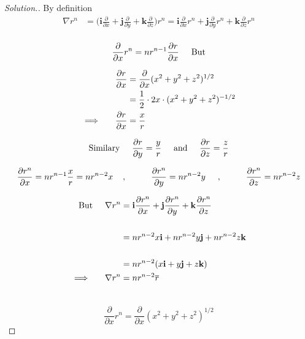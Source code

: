 \documentclass[11pt,a4paper]{article}
\theoremstyle{definition}
\newenvironment{solution}
  {\renewcommand{\qedsymbol}{}\begin{proof}[\textit{Solution}.]}
  {\end{proof}}
\begin{document}
\begin{solution}
By definition
\begin{align*}
\nabla r^n  & = \Bigg( \textbf{i} \frac{\partial}{\partial x} + \textbf{j} \frac{\partial}{\partial y} + \textbf{k}\frac{\partial}{\partial z}\Bigg) r^n
  = \textbf{i} \frac{\partial}{\partial x}r^n + \textbf{j} \frac{\partial}{\partial y}r^n + \textbf{k}\frac{\partial}{\partial z}r^n\\
\end{align*}

$$ \frac{\partial}{\partial x}r^n = n r^{n-1} \frac{\partial r}{\partial x}\hspace{0.5cm}\text{But}$$

\begin{align*}
\frac{\partial r}{\partial x} & = \frac{\partial}{\partial x} (x^2 + y^2 + z^2)^{1/2}\\
& = \frac{1}{2}\cdot 2x\cdot (x^2 + y^2 + z^2)^{-1/2}\\
\implies \hspace{0.5cm}\frac{\partial r}{\partial x} & = \frac{x}{r}\\
\end{align*}

$$\text{Similary}\hspace{0.5cm} \frac{\partial r}{\partial y} = \frac{y}{r}\hspace{0.5cm} \text{and} \hspace{0.5cm} \frac{\partial r}{\partial z} = \frac{z}{r}$$


$$\frac{\partial r^n}{\partial x} = nr^{n-1} \frac{x}{r} = nr^{n-2}x\hspace{0.4cm},\hspace{1cm} \frac{\partial r^n}{\partial y} = nr^{n-2}y\hspace{0.5cm},\hspace{1cm} \frac{\partial r^n}{\partial z}= nr^{n-2}z$$

\begin{align*}
\text{But} \hspace{0.5cm} \nabla r^n & = \textbf{i}\frac{\partial r^n}{\partial x} + \textbf{j} \frac{\partial r^n}{\partial y} + \textbf{k} \frac{\partial r^n}{\partial z}\\\\
& = nr^{n-2}x \textbf{i} + nr^{n-2} y \textbf{j} + nr^{n-2} z\textbf{k}\\\\
& = nr^{n-2} (x\textbf{i} + y \textbf{j} + z\textbf{k})\\
\implies \hspace{0.5cm} \nabla r^n & = nr^{n-2}\overline{r}\\\\
\end{align*}

$$\frac{\partial}{\partial x} r^n = \frac{\partial}{\partial x} (x^2 + y^2 + z^2 )^{1/2}$$
\end{solution}
\end{document}
